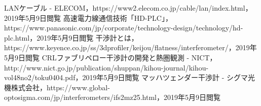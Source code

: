 \documentclass[a4paper]{ltjsarticle}
\begin{document}
\begin{thebibliography}{99}
	 LANケーブル - ELECOM，https://www2.elecom.co.jp/cable/lan/index.html，2019年5月9日閲覧
	 高速電力線通信技術「HD-PLC」，https://www.panasonic.com/jp/corporate/technology-design/technology/hd-plc.html，2019年5月9日閲覧
	 干渉計とは，https://www.keyence.co.jp/ss/3dprofiler/keijou/flatness/interferometer/，2019年5月9日閲覧
	 CRLファブリペロー干渉計の開発と熱圏観測 - NICT，http://www.nict.go.jp/publication/shuppan/kihou-journal/kihou-vol48no2/toku0404.pdf，2019年5月9日閲覧
	 マッハツェンダー干渉計 - シグマ光機株式会社，https://www.global-optosigma.com/jp/interferometers/ifs2mz25.html，2019年5月9日閲覧
\end{thebibliography}
\end{document}
